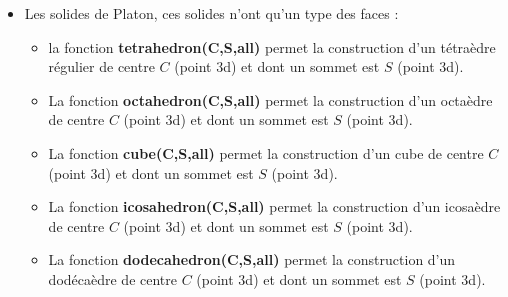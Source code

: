 \begin{itemize}
    \item Les solides de Platon, ces solides n'ont qu'un type des faces :
        \begin{itemize}
            \item  la fonction \textbf{tetrahedron(C,S,all)} permet la construction d'un tétraèdre régulier de centre $C$ (point 3d) et dont un sommet est $S$ (point 3d).
            \item La fonction \textbf{octahedron(C,S,all)} permet la construction d'un octaèdre de centre $C$ (point 3d) et dont un sommet est $S$ (point 3d).
            \item La fonction \textbf{cube(C,S,all)} permet la construction d'un cube de centre $C$ (point 3d) et dont un sommet est $S$ (point 3d).
            \item La fonction \textbf{icosahedron(C,S,all)} permet la construction d'un icosaèdre de centre $C$ (point 3d) et dont un sommet est $S$ (point 3d).
            \item La fonction \textbf{dodecahedron(C,S,all)} permet la construction d'un dodécaèdre de centre $C$ (point 3d) et dont un sommet est $S$ (point 3d).
        \end{itemize}


\end{itemize}
